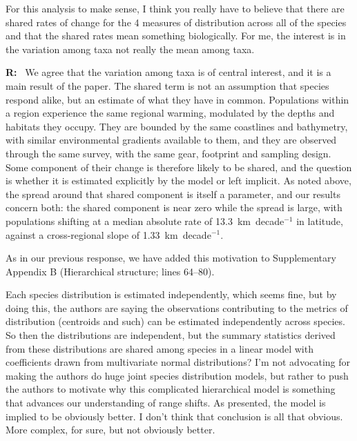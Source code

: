 \documentclass[11pt]{article}
\newcommand{\reviewer}[1]{\par\medskip\noindent\textcolor{revcolor}{#1}\par}
\newenvironment{reply}
{\par\smallskip\begingroup\color{replycolor}\noindent\textbf{R:}\ }
{\endgroup\par\medskip}
\begin{document}
\reviewer{For this analysis to make sense, I think you really have to believe that there are shared rates of change for the 4 measures of distribution across all of the species and that the shared rates mean something biologically. For me, the interest is in the variation among taxa not really the mean among taxa.}

\begin{reply}
We agree that the variation among taxa is of central interest, and it is a main result of the paper. The shared term is not an assumption that species respond alike, but an estimate of what they have in common. Populations within a region experience the same regional warming, modulated by the depths and habitats they occupy. They are bounded by the same coastlines and bathymetry, with similar environmental gradients available to them, and they are observed through the same survey, with the same gear, footprint and sampling design. Some component of their change is therefore likely to be shared, and the question is whether it is estimated explicitly by the model or left implicit. As noted above, the spread around that shared component is itself a parameter, and our results concern both: the shared component is near zero while the spread is large, with populations shifting at a median absolute rate of 13.3~km~decade$^{-1}$ in latitude, against a cross-regional slope of 1.33~km~decade$^{-1}$.

As in our previous response, we have added this motivation to Supplementary Appendix B (Hierarchical structure; lines 64--80).
\end{reply}

\reviewer{Each species distribution is estimated independently, which seems fine, but by doing this, the authors are saying the observations contributing to the metrics of distribution (centroids and such) can be estimated independently across species. So then the distributions are independent, but the summary statistics derived from these distributions are shared among species in a linear model with coefficients drawn from multivariate normal distributions? I'm not advocating for making the authors do huge joint species distribution models, but rather to push the authors to motivate why this complicated hierarchical model is something that advances our understanding of range shifts. As presented, the model is implied to be obviously better. I don't think that conclusion is all that obvious. More complex, for sure, but not obviously better.
}
\end{document}
